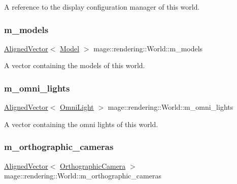 A reference to the display configuration manager of this world. \mbox{\label{classmage_1_1rendering_1_1_world_aed32b3cd3f6d46c68493a48d42047c1f}} 
\subsubsection{\texorpdfstring{m\+\_\+models}{m\_models}}
{\footnotesize\ttfamily \mbox{\hyperlink{namespacemage_a8664bfb5ce2179fc64eae9f82c8a5ba8}{Aligned\+Vector}}$<$ \mbox{\hyperlink{classmage_1_1rendering_1_1_model}{Model}} $>$ mage\+::rendering\+::\+World\+::m\+\_\+models\hspace{0.3cm}{\ttfamily [private]}}

A vector containing the models of this world. \mbox{\label{classmage_1_1rendering_1_1_world_ad7314066fa640f62ff56f90b0762a66d}} 
\subsubsection{\texorpdfstring{m\+\_\+omni\+\_\+lights}{m\_omni\_lights}}
{\footnotesize\ttfamily \mbox{\hyperlink{namespacemage_a8664bfb5ce2179fc64eae9f82c8a5ba8}{Aligned\+Vector}}$<$ \mbox{\hyperlink{classmage_1_1rendering_1_1_omni_light}{Omni\+Light}} $>$ mage\+::rendering\+::\+World\+::m\+\_\+omni\+\_\+lights\hspace{0.3cm}{\ttfamily [private]}}

A vector containing the omni lights of this world. \mbox{\label{classmage_1_1rendering_1_1_world_a6cbb80ebd76a1f7121b455251fcab6db}} 
\subsubsection{\texorpdfstring{m\+\_\+orthographic\+\_\+cameras}{m\_orthographic\_cameras}}
{\footnotesize\ttfamily \mbox{\hyperlink{namespacemage_a8664bfb5ce2179fc64eae9f82c8a5ba8}{Aligned\+Vector}}$<$ \mbox{\hyperlink{classmage_1_1rendering_1_1_orthographic_camera}{Orthographic\+Camera}} $>$ mage\+::rendering\+::\+World\+::m\+\_\+orthographic\+\_\+cameras\hspace{0.3cm}{\ttfamily [private]}}

